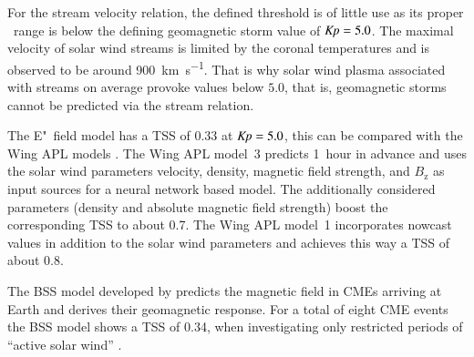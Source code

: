 For the stream velocity relation, the defined \Kp{} threshold is of little use as its proper \Kp~range is below the defining geomagnetic storm value of $\text{\textit{Kp}} = 5.0$. The maximal velocity of solar wind streams is limited by the coronal temperatures \citep{Parker1958} and is observed to be around \SI{900}{\km\per\s}. That is why solar wind plasma associated with streams on average provoke \Kp{} values below $5.0$, that is, geomagnetic storms cannot be predicted via the stream relation.

The E"~field model has a TSS of 0.33 at $\text{\textit{Kp}} = 5.0$, this can be compared with the Wing APL models \citep[Fig.~13]{Wing2005}. The Wing APL model~3 predicts \Kp{} 1~hour in advance and uses the solar wind parameters velocity, density, magnetic field strength, and $B_\text{z}$ as input sources for a neural network based model. The additionally considered parameters (density and absolute magnetic field strength) boost the corresponding TSS to about 0.7. The Wing APL model~1 incorporates \Kp{} nowcast values in addition to the solar wind parameters and achieves this way a TSS of about 0.8.

The BSS model developed by \citet{Savani2015,Savani2017} predicts the magnetic field in CMEs arriving at Earth and derives their geomagnetic response. For a total of eight CME events the BSS model shows a TSS of 0.34, when investigating only restricted periods of ``active solar wind'' \citep[Tab.~3]{Savani2017}.


